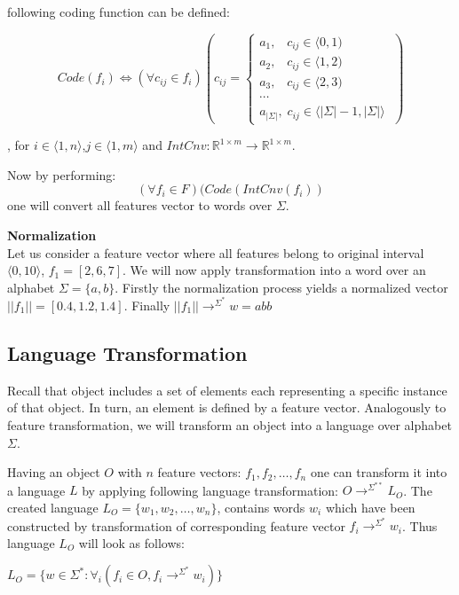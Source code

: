 \documentclass{mini}
\newcommand{\featureTransformationWord}[1]{
    \rightarrow^{#1^{*}}
}
\newcommand{\featureTransformationLanguage}[1]{
    \rightarrow^{#1^{**}}
}
\newcommand{\featureNorm}[1]{
    ||#1||
}
\begin{document}
following coding function can be defined:

\begin{equation}
Code(f_i) \Leftrightarrow (\forall{c_{ij} \in f_i})(c_{ij} = 
\begin{cases}
a_1 , \;\;\; c_{ij} \in  \langle 0 , 1)  \\
a_2 , \;\;\; c_{ij} \in  \langle 1 , 2 ) \\
a_3 , \;\;\; c_{ij} \in  \langle 2 , 3 )\\
\cdots \\
a_{|\Sigma|} , \; c_{ij} \in \langle |\Sigma| -1, |\Sigma|  \rangle\; 
\end{cases})
\end{equation}

, for $i \in \langle 1, n \rangle$,$j \in \langle 1, m \rangle$ and $IntCnv : \mathbb{R}^{1 \times m} \rightarrow \mathbb{R}^{1 \times m}$. 

Now by performing:
\begin{equation}
(\forall{f_i \in F})(Code(IntCnv(f_i))
\end{equation}
one will convert all features vector to words over $\Sigma$.

\begin{example} {\bf Normalization}\\
    Let us consider a feature vector where all features belong to original interval $\langle 0, 10 \rangle$, $f_1=[2, 6, 7]$. We will now apply transformation into a word over an alphabet $\Sigma=\{a,b\}$. Firstly the normalization process yields a normalized vector $\featureNorm{f_1}=[0.4, 1.2, 1.4]$. Finally $\featureNorm{f_1} \featureTransformationWord{\Sigma}w=abb$
\end{example}


\subsection{Language Transformation}\label{sec:lan_theory_transf_lan}
Recall that object includes a set of elements each representing  a specific instance of that object. In turn, an element is defined by a feature vector. Analogously to feature transformation, we will transform an object into a language over alphabet $\Sigma$.

Having an object $O$ with $n$ feature vectors: $f_1, f_2,\ldots,f_n$ one can transform it into a language $L$ by applying following language transformation: $O \featureTransformationLanguage{\Sigma} L_{O}$. The created language $L_{O} = \{w_1, w_2,\ldots,w_n\}$, contains words $w_i$ which have been constructed by transformation of corresponding feature vector $f_i \featureTransformationWord{\Sigma} w_i$. Thus language $L_{O}$ will look as follows:
\begin{center}
    $L_{O} = \{w \in \Sigma^{*} : \forall_{i} (f_{i} \in O, f_{i} \featureTransformationWord{\Sigma} w_{i}) \}$
\end{center}
\end{document}
